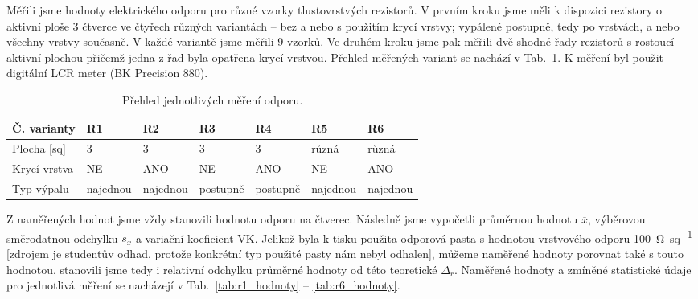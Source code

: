Měřili jsme hodnoty elektrického odporu pro různé vzorky tlustovrstvých rezistorů. V prvním kroku jsme měli k dispozici rezistory o aktivní ploše 3 čtverce ve čtyřech různých variantách -- bez a nebo s použitím krycí vrstvy; vypálené postupně, tedy po vrstvách, a nebo všechny vrstvy současně. V každé variantě jsme měřili 9 vzorků. Ve druhém kroku jsme pak měřili dvě shodné řady rezistorů s rostoucí aktivní plochou přičemž jedna z řad byla opatřena krycí vrstvou. 
Přehled měřených variant se nachází v Tab.~\ref{tab:r_varianty}. 
K měření byl použit digitální LCR meter (BK Precision 880).

\begin{table}[h!]
    \caption{Přehled jednotlivých měření odporu.}
    \centering
    \def\arraystretch{1.4}
    \begin{tabular}{l|l|l|l|l|l|l}
        Č. varianty  & R1       & R2       & R3       & R4       & R5       & R6       \\ \hline
        Plocha [sq]  & 3        & 3        & 3        & 3        & různá    & různá    \\ \hline
        Krycí vrstva & NE       & ANO      & NE       & ANO      & NE       & ANO      \\ \hline
        Typ výpalu   & najednou & najednou & postupně & postupně & najednou & najednou \\ 
        \end{tabular}
    \label{tab:r_varianty}
\end{table}

Z naměřených hodnot jsme vždy stanovili hodnotu odporu na čtverec. Následně jsme vypočetli průměrnou hodnotu \(\overline{x} \), výběrovou směrodatnou odchylku \(s_{x} \) a variační koeficient VK. Jelikož byla k tisku použita odporová pasta s hodnotou vrstvového odporu \qty{100}{\ohm\per sq} [zdrojem je studentův odhad, protože konkrétní typ použité pasty nám nebyl odhalen], můžeme naměřené hodnoty porovnat také s touto hodnotou, stanovili jsme tedy i relativní odchylku průměrné hodnoty od této teoretické \(\Delta_{r} \).
Naměřené hodnoty a zmíněné statistické údaje pro jednotlivá měření se nacházejí v Tab.~\ref{tab:r1_hodnoty} -- \ref{tab:r6_hodnoty}.



